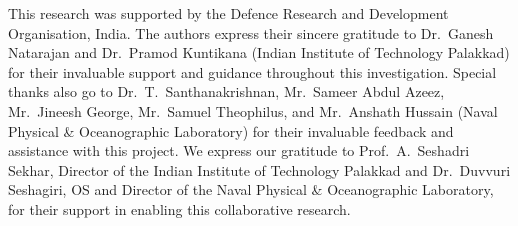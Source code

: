 \documentclass[11pt,cleanfoot]{asme2ej}
\begin{document}
\begin{acknowledgment}
This research was supported by the Defence Research and Development Organisation, India. The authors express their sincere gratitude to Dr.~Ganesh Natarajan and Dr.~Pramod Kuntikana (Indian Institute of Technology Palakkad) for their invaluable support and guidance throughout this investigation. Special thanks also go to Dr.~T.~Santhanakrishnan, Mr.~Sameer Abdul Azeez, Mr.~Jineesh George, Mr.~Samuel Theophilus, and Mr.~Anshath Hussain (Naval Physical \& Oceanographic Laboratory) for their invaluable feedback and assistance with this project. We express our gratitude to Prof.~A.~Seshadri Sekhar, Director of the Indian Institute of Technology Palakkad and Dr.~Duvvuri Seshagiri, OS and Director of the Naval Physical \& Oceanographic Laboratory, for their support in enabling this collaborative research.
\end{acknowledgment}
\nolinenumbers
%






\newpage
\listoffigures

\newpage
\listoftables
\end{document}
